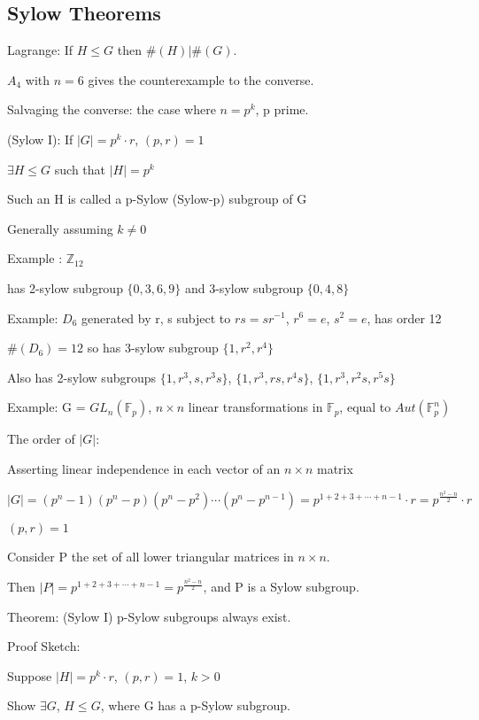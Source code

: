 \documentclass[12pt]{article}
\begin{document}
\subsection{Sylow Theorems}

Lagrange: If $H \leq G$ then $\#(H)|\#(G)$.

$A_4$ with $n = 6$ gives the counterexample to the converse.

\noindent
Salvaging the converse: the case where $n = p^k$, p prime.

\noindent
(Sylow I): If $|G| = p^k \cdot r$, $(p, r) = 1$

$\exists H \leq G$ such that $|H| = p^k$

Such an H is called a p-Sylow (Sylow-p) subgroup of G

Generally assuming $k \neq 0$

\noindent
Example : $\mathds{Z}_{12}$

has 2-sylow subgroup $\{0, 3, 6, 9\}$ and 3-sylow subgroup $\{0, 4, 8\}$

\noindent
Example: $D_6$ generated by r, s subject to $rs = sr^{-1}$, $r^6 = e$, $s^2 = e$, has order 12

$\#(D_6) = 12$ so has 3-sylow subgroup $\{1, r^2, r^4\}$

Also has 2-sylow subgroups $\{1, r^3, s, r^3s\}$, $\{1, r^3, rs, r^4s\}$, $\{1, r^3, r^2s, r^5s\}$

\noindent
Example: G = $GL_n(\mathds{F}_p)$, $n \times n$ linear transformations in $\mathds{F}_p$, equal to $Aut(\mathds{F}_p^n)$

\noindent
The order of $|G|$:  

Asserting linear independence in each vector of an $n \times n$ matrix

$|G| = (p^n - 1)(p^n-p)(p^n-p^2)\cdots(p^n-p^{n-1}) = p^{1 + 2 + 3 + \cdots + n - 1}\cdot r = p^{\frac{n^2 - n}{2}} \cdot r$

$(p, r) = 1$

Consider P the set of all lower triangular matrices in $n \times n$.

Then $|P| = p^{1 + 2 + 3 + \cdots + n - 1} = p^{\frac{n^2 - n}{2}}$, and P is a Sylow subgroup.

\noindent
Theorem: (Sylow I) p-Sylow subgroups always exist.

\noindent
Proof Sketch:

Suppose $|H| = p^k \cdot r$, $(p, r) = 1$, $k > 0$

Show $\exists G$, $H \leq G$, where G has a p-Sylow subgroup.
\end{document}
